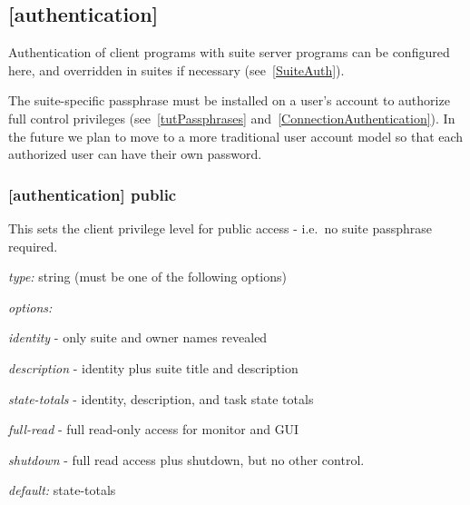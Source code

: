 \subsection{[authentication]}
\label{GlobalAuth}

Authentication of client programs with suite server programs can be configured
here, and overridden in suites if necessary (see~\ref{SuiteAuth}).

The suite-specific passphrase must be installed on a user's account to
authorize full control privileges (see~\ref{tutPassphrases}
and~\ref{ConnectionAuthentication}). In the future we plan to move to a more
traditional user account model so that each authorized user can have their own
password.

\subsubsection[public]{[authentication] \textrightarrow public}

This sets the client privilege level for public access - i.e.\ no suite passphrase
required.

\begin{myitemize}
\item {\em type:} string (must be one of the following options)
\item {\em options:}
    \begin{myitemize}
        \item {\em identity} - only suite and owner names revealed
        \item {\em description} - identity plus suite title and description
        \item {\em state-totals} - identity, description, and task state totals
        \item {\em full-read} - full read-only access for monitor and GUI
        \item {\em shutdown} - full read access plus shutdown, but no other
            control.
    \end{myitemize}
\item {\em default:} state-totals
\end{myitemize}
